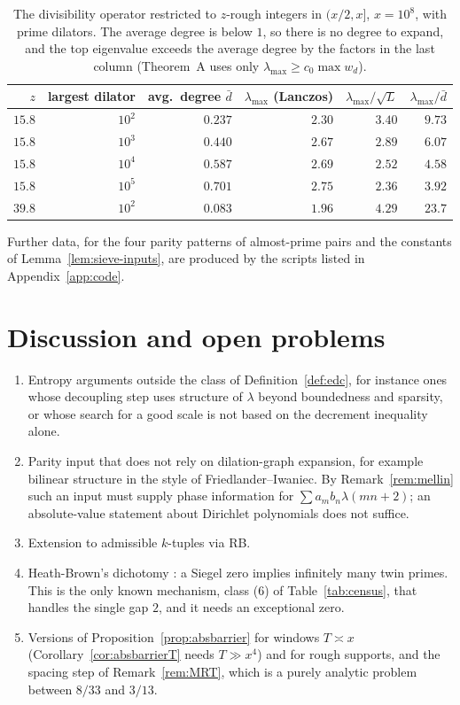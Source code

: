 \documentclass[11pt]{amsart}
\theoremstyle{definition}
\theoremstyle{remark}
\begin{document}
\begin{table}[h]
\centering
\begin{tabular}{rrrrrr}
\toprule
$z$ & largest dilator & avg.\ degree $\bar d$ & $\lambda_{\max}$ (Lanczos) & $\lambda_{\max}/\sqrt L$ & $\lambda_{\max}/\bar d$\\
\midrule
$15.8$ & $10^2$ & $0.237$ & $2.30$ & $3.40$ & $9.73$\\
$15.8$ & $10^3$ & $0.440$ & $2.67$ & $2.89$ & $6.07$\\
$15.8$ & $10^4$ & $0.587$ & $2.69$ & $2.52$ & $4.58$\\
$15.8$ & $10^5$ & $0.701$ & $2.75$ & $2.36$ & $3.92$\\
$39.8$ & $10^2$ & $0.083$ & $1.96$ & $4.29$ & $23.7$\\
\bottomrule
\end{tabular}
\caption{The divisibility operator restricted to $z$-rough integers in $(x/2,x]$, $x=10^8$, with prime dilators. The average degree is below $1$, so there is no degree to expand, and the top eigenvalue exceeds the average degree by the factors in the last column (Theorem~A uses only $\lambda_{\max}\ge c_0\max w_d$).}
\end{table}

Further data, for the four parity patterns of almost-prime pairs and the constants of Lemma~\ref{lem:sieve-inputs}, are produced by the scripts listed in Appendix~\ref{app:code}.

\section{Discussion and open problems}\label{sec:discussion}
\begin{enumerate}
\item Entropy arguments outside the class of Definition~\ref{def:edc}, for instance ones whose decoupling step uses structure of $\lambda$ beyond boundedness and sparsity, or whose search for a good scale is not based on the decrement inequality alone.
\item Parity input that does not rely on dilation-graph expansion, for example bilinear structure in the style of Friedlander--Iwaniec. By Remark~\ref{rem:mellin} such an input must supply phase information for $\sum a_mb_n\lambda(mn+2)$; an absolute-value statement about Dirichlet polynomials does not suffice.
\item Extension to admissible $k$-tuples via RB.
\item Heath-Brown's dichotomy \cite{HB83,TT21,MM23}: a Siegel zero implies infinitely many twin primes. This is the only known mechanism, class (6) of Table~\ref{tab:census}, that handles the single gap $2$, and it needs an exceptional zero.
\item Versions of Proposition~\ref{prop:absbarrier} for windows $T\asymp x$ (Corollary~\ref{cor:absbarrierT} needs $T\gg x^4$) and for rough supports, and the spacing step of Remark~\ref{rem:MRT}, which is a purely analytic problem between $8/33$ and $3/13$.
\end{enumerate}
\end{document}
